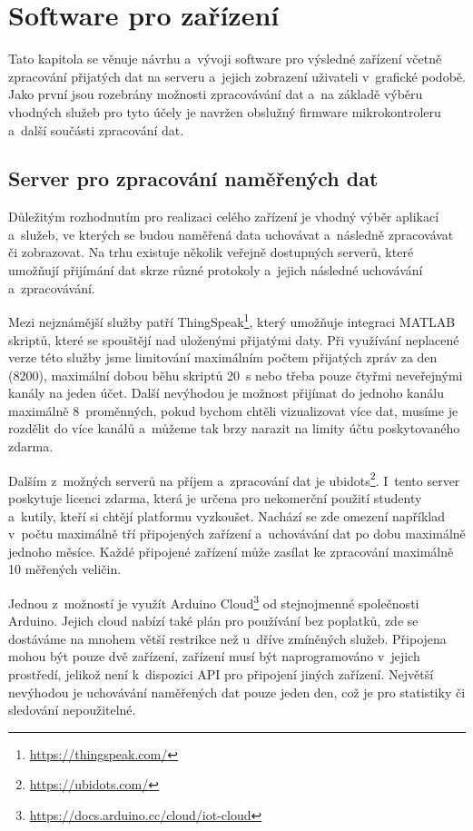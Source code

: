 \chapter{Software pro zařízení}

Tato kapitola se věnuje návrhu a~vývoji software pro výsledné zařízení včetně zpracování přijatých dat na serveru a~jejich zobrazení uživateli v~grafické podobě. Jako první jsou rozebrány možnosti zpracovávání dat a~na základě výběru vhodných služeb pro tyto účely je navržen obslužný firmware mikrokontroleru a~další součásti zpracování dat.

\section{Server pro zpracování naměřených dat}

Důležitým rozhodnutím pro realizaci celého zařízení je vhodný výběr aplikací a~služeb, ve kterých se budou naměřená data uchovávat a~následně zpracovávat či zobrazovat. Na trhu existuje několik veřejně dostupných serverů, které umožňují přijímání dat skrze různé protokoly a~jejich následné uchovávání a~zpracovávání.

Mezi nejznámější služby patří ThingSpeak\footnote{\url{https://thingspeak.com/}}, který umožňuje integraci MATLAB skriptů, které se spouštějí nad uloženými přijatými daty. Při využívání neplacené verze této služby jsme limitování maximálním počtem přijatých zpráv za den (\SI{8200}{}), maximální dobou běhu skriptů \SI{20}{\second} nebo třeba pouze čtyřmi neveřejnými kanály na jeden účet. Další nevýhodou je možnost přijímat do jednoho kanálu maximálně 8~proměnných, pokud bychom chtěli vizualizovat více dat, musíme je rozdělit do více kanálů a~můžeme tak brzy narazit na limity účtu poskytovaného zdarma.

Dalším z~možných serverů na příjem a~zpracování dat je ubidots\footnote{\url{https://ubidots.com/}}. I~tento server poskytuje licenci zdarma, která je určena pro nekomerční použití studenty a~kutily, kteří si chtějí platformu vyzkoušet. Nachází se zde omezení například v~počtu maximálně tří připojených zařízení a~uchovávání dat po dobu maximálně jednoho měsíce. Každé připojené zařízení může zasílat ke zpracování maximálně \SI{10}{} měřených veličin.

Jednou z~možností je využít Arduino Cloud\footnote{\url{https://docs.arduino.cc/cloud/iot-cloud}} od stejnojmenné společnosti Arduino. Jejich cloud nabízí také plán pro používání bez poplatků, zde se dostáváme na mnohem větší restrikce než u~dříve zmíněných služeb. Připojena mohou být pouze dvě zařízení, zařízení musí být naprogramováno v~jejich prostředí, jelikož není k~dispozici API pro připojení jiných zařízení. Největší nevýhodou je uchovávání naměřených dat pouze jeden den, což je pro statistiky či sledování nepoužitelné.

